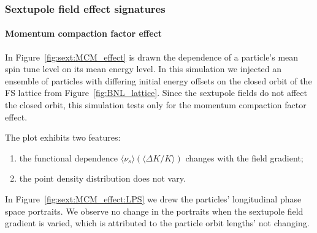 \documentclass[]{elsarticle}
\newcommand{\D}{\Delta}
\newcommand{\avg}[1]{\langle{#1}\rangle}
\begin{document}
\subsubsection{Sextupole field effect signatures}
\paragraph{Momentum compaction factor effect}

In Figure~\ref{fig:sext:MCM_effect} is drawn the dependence of a particle's mean spin tune level
on its mean energy level. In this simulation we injected an ensemble of particles with differing
initial energy offsets on the closed orbit of the FS lattice from Figure~\ref{fig:BNL_lattice}.
Since the sextupole fields do not affect the closed orbit, this simulation tests only for the
momentum compaction factor effect. 

The plot exhibits two features:
\begin{enumerate}[(1)]
\item the functional dependence $\avg{\nu_s}(\avg{\D K/K})$ changes with the field gradient;
  \item the point density distribution does not vary.
\end{enumerate}

In Figure~\ref{fig:sext:MCM_effect:LPS} we drew the particles' longitudinal phase space portraits.
We observe no change in the portraits when the sextupole field gradient is varied,
which is attributed to the particle orbit lengths' not changing.
\end{document}
